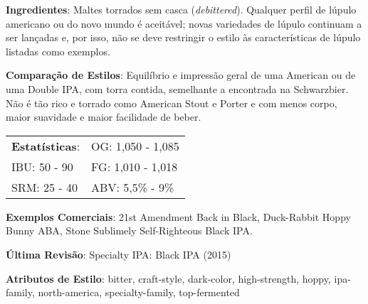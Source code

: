 \textbf{Ingredientes}: Maltes torrados sem casca (\textit{debittered}). Qualquer perfil de lúpulo americano ou do novo mundo é aceitável; novas variedades de lúpulo continuam a ser lançadas e, por isso, não se deve restringir o estilo às características de lúpulo listadas como exemplos.

\textbf{Comparação de Estilos}: Equilíbrio e impressão geral de uma American ou de uma Double IPA, com torra contida, semelhante a encontrada na Schwarzbier. Não é tão rico e torrado como American Stout e Porter e com menos corpo, maior suavidade e maior facilidade de beber.

\begin{tabular}{@{}p{35mm}p{35mm}@{}}
  \textbf{Estatísticas}: & OG: 1,050 - 1,085 \\
  IBU: 50 - 90  & FG: 1,010 - 1,018 \\
  SRM: 25 - 40  & ABV: 5,5\% - 9\%
\end{tabular}

\textbf{Exemplos Comerciais}: 21st Amendment Back in Black, Duck-Rabbit Hoppy Bunny ABA, Stone Sublimely Self-Righteous Black IPA.

\textbf{Última Revisão}: Specialty IPA: Black IPA (2015)

\textbf{Atributos de Estilo}: bitter, craft-style, dark-color, high-strength, hoppy, ipa-family, north-america, specialty-family, top-fermented
